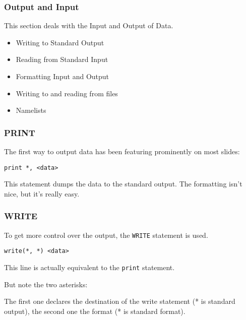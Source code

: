 \begin{frame}[fragile]
  \frametitle{Output and Input}

  This section deals with the Input and Output of Data.

  \begin{itemize}
    \item Writing to Standard Output
    \item Reading from Standard Input
    \item Formatting Input and Output
    \item Writing to and reading from files
    \item Namelists
  \end{itemize}

\end{frame}

\begin{frame}[fragile]
  \frametitle{PRINT}

  The first way to output data has been featuring prominently
  on most slides:

  \begin{lstlisting}[numbers=none]
print *, <data>
  \end{lstlisting}

  This statement dumps the data to the standard output.
  The formatting isn't nice, but it's really easy.

\end{frame}

\begin{frame}[fragile]
  \frametitle{WRITE}

  To get more control over the output, the \texttt{WRITE}
  statement is used.

  \begin{lstlisting}[numbers=none]
write(*, *) <data>
  \end{lstlisting}

  This line is actually equivalent to the \texttt{print} statement.

  But note the two asterisks:

  The first one declares the destination of the write statement (* is standard output),
  the second one the format (* is standard format).

\end{frame}

